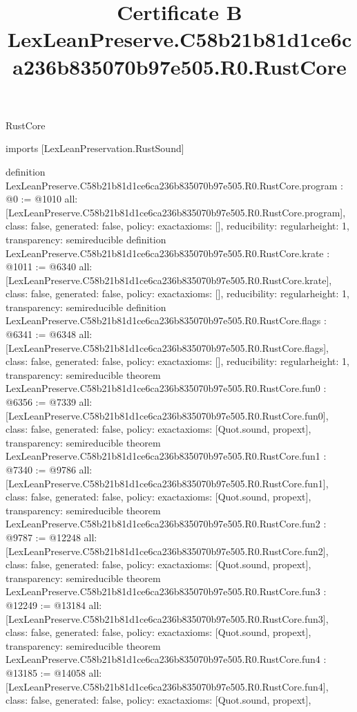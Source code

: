 \begin{lexlean}{RustCore}
\title{Certificate B LexLeanPreserve.C58b21b81d1ce6ca236b835070b97e505.R0.RustCore}
\begin{coremodule}
imports [LexLeanPreservation.RustSound]

definition LexLeanPreserve.C58b21b81d1ce6ca236b835070b97e505.R0.RustCore.program : @0 := @1010 {
  all: [LexLeanPreserve.C58b21b81d1ce6ca236b835070b97e505.R0.RustCore.program],
  class: false,
  generated: false,
  policy: exact{axioms: []},
  reducibility: regular{height: 1},
  transparency: semireducible
}
definition LexLeanPreserve.C58b21b81d1ce6ca236b835070b97e505.R0.RustCore.krate : @1011 := @6340 {
  all: [LexLeanPreserve.C58b21b81d1ce6ca236b835070b97e505.R0.RustCore.krate],
  class: false,
  generated: false,
  policy: exact{axioms: []},
  reducibility: regular{height: 1},
  transparency: semireducible
}
definition LexLeanPreserve.C58b21b81d1ce6ca236b835070b97e505.R0.RustCore.flags : @6341 := @6348 {
  all: [LexLeanPreserve.C58b21b81d1ce6ca236b835070b97e505.R0.RustCore.flags],
  class: false,
  generated: false,
  policy: exact{axioms: []},
  reducibility: regular{height: 1},
  transparency: semireducible
}
theorem LexLeanPreserve.C58b21b81d1ce6ca236b835070b97e505.R0.RustCore.fun0 : @6356 := @7339 {
  all: [LexLeanPreserve.C58b21b81d1ce6ca236b835070b97e505.R0.RustCore.fun0],
  class: false,
  generated: false,
  policy: exact{axioms: [Quot.sound, propext]},
  transparency: semireducible
}
theorem LexLeanPreserve.C58b21b81d1ce6ca236b835070b97e505.R0.RustCore.fun1 : @7340 := @9786 {
  all: [LexLeanPreserve.C58b21b81d1ce6ca236b835070b97e505.R0.RustCore.fun1],
  class: false,
  generated: false,
  policy: exact{axioms: [Quot.sound, propext]},
  transparency: semireducible
}
theorem LexLeanPreserve.C58b21b81d1ce6ca236b835070b97e505.R0.RustCore.fun2 : @9787 := @12248 {
  all: [LexLeanPreserve.C58b21b81d1ce6ca236b835070b97e505.R0.RustCore.fun2],
  class: false,
  generated: false,
  policy: exact{axioms: [Quot.sound, propext]},
  transparency: semireducible
}
theorem LexLeanPreserve.C58b21b81d1ce6ca236b835070b97e505.R0.RustCore.fun3 : @12249 := @13184 {
  all: [LexLeanPreserve.C58b21b81d1ce6ca236b835070b97e505.R0.RustCore.fun3],
  class: false,
  generated: false,
  policy: exact{axioms: [Quot.sound, propext]},
  transparency: semireducible
}
theorem LexLeanPreserve.C58b21b81d1ce6ca236b835070b97e505.R0.RustCore.fun4 : @13185 := @14058 {
  all: [LexLeanPreserve.C58b21b81d1ce6ca236b835070b97e505.R0.RustCore.fun4],
  class: false,
  generated: false,
  policy: exact{axioms: [Quot.sound, propext]},
}
\end{coremodule}
\end{lexlean}
